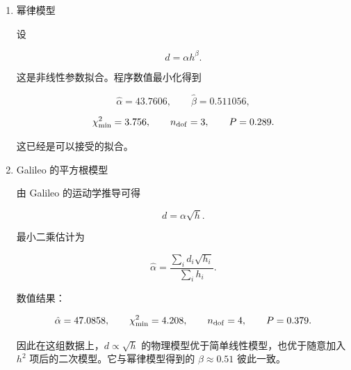 \begin{question}
\begin{solution}
\begin{enumerate}
\item 幂律模型

设

\[
d=\alpha h^\beta.
\]

这是非线性参数拟合。程序数值最小化得到

\[
\hat\alpha=43.7606,
\qquad
\hat\beta=0.511056,
\]

\[
\chi^2_{\min}=3.756,
\qquad
n_{\rm dof}=3,
\qquad
P=0.289.
\]

这已经是可以接受的拟合。

\item Galileo 的平方根模型

由 Galileo 的运动学推导可得

\[
d=\alpha\sqrt h.
\]

最小二乘估计为

\[
\hat\alpha=
\frac{\sum_i d_i\sqrt{h_i}}{\sum_i h_i}.
\]

数值结果：

\[
\hat\alpha=47.0858,
\qquad
\chi^2_{\min}=4.208,
\qquad
n_{\rm dof}=4,
\qquad
P=0.379.
\]

因此在这组数据上，\(d\propto\sqrt h\)
的物理模型优于简单线性模型，也优于随意加入 \(h^2\)
项后的二次模型。它与幂律模型得到的 \(\beta\approx0.51\) 彼此一致。
\end{enumerate}
\end{solution}
\end{question}



